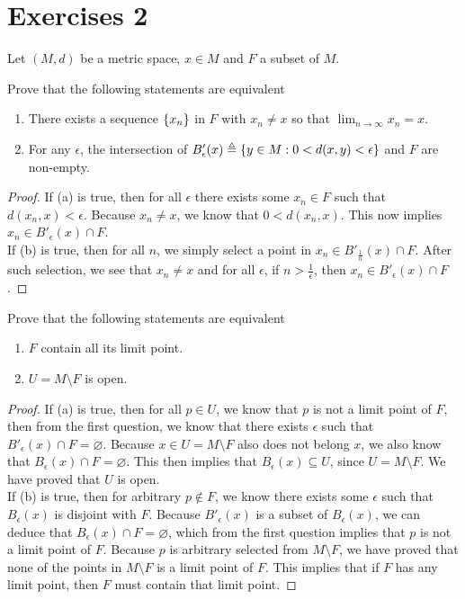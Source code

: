 \documentclass{report}
\begin{document}
\section{Exercises 2}
\begin{mdframed}
Let $(M,d)$ be a metric space, $x \in M $ and $F$ a subset of $M$. 
\end{mdframed}
\begin{question}{}{}
Prove that the following statements are equivalent
\begin{enumerate}[label=(\alph*)]
  \item There exists a sequence $\{ x_n \}$ in $F$ with $x_n\neq x$ so that $\lim_{n\to \infty}x_n=x$. 
  \item For any $\epsilon $, the intersection of $B'_\epsilon  (x)\triangleq \{ y\in M:0<d(x,y)<\epsilon  \}$ and $F$ are non-empty. 
\end{enumerate}
\end{question}
\begin{proof}
If (a) is true, then for all $\epsilon $ there exists some $x_n\in F$ such that $d(x_n,x)<\epsilon $. Because $x_n\neq x$, we know that $0<d(x_n,x)$. This now implies $x_n \in B'_\epsilon (x)\cap F$. \\

If (b) is true, then for all $n$, we simply select a point in  $x_n \in B'_{\frac{1}{n}} (x)\cap F$. After such selection, we see that $x_n\neq x$ and for all $\epsilon $, if $n>\frac{1}{\epsilon }$, then $x_n\in B'_\epsilon (x)\cap F$. 
\end{proof}
\begin{question}{}{}
Prove that the following statements are equivalent 
\begin{enumerate}[label=(\alph*)]
  \item $F$ contain all its limit point.
  \item $U=M\setminus F$ is open.
\end{enumerate}
\end{question}
\begin{proof}
If (a) is true, then for all $p\in  U$, we know that $p$ is not a limit point of $F$, then from the first question, we know that there exists  $\epsilon $ such that $B'_\epsilon (x)\cap F=\varnothing$. Because $x\in U=M\setminus F$ also does not belong $x$, we also know that  $B_\epsilon (x)\cap F=\varnothing$. This then implies that $B_\epsilon (x)\subseteq U$, since $U=M\setminus F$. We have proved that $U$ is open.   \\

If (b) is true, then for arbitrary $p\not\in F$, we know there exists some $\epsilon $ such that $B_\epsilon (x)$ is disjoint with $F$. Because  $B'_\epsilon (x)$ is a subset of $B_\epsilon (x)$, we can deduce that $B_\epsilon (x)\cap F=\varnothing$, which from the first question implies that $p$ is not a limit point of $F$. Because $p$ is arbitrary selected from $M\setminus F$, we have proved that none of the points in $M \setminus F$ is a limit point of $F$. This implies that if  $F$ has any limit point, then $F$ must contain that limit point.
\end{proof}
\end{document}
